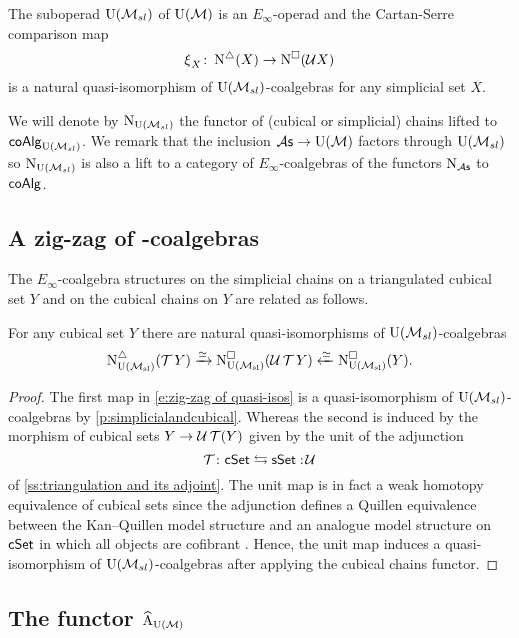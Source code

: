 \begin{proposition} \label{p:simplicialandcubical}
	The suboperad ${\operatorname{U}(\mathcal{M}_{sl})}$ of ${\operatorname{U}(\mathcal{M})}$ is an $E_\infty$-operad and the Cartan-Serre comparison map
	\[
	\operatorname{\xi}_X \colon \operatorname{N^{\triangle}}(X) \to \operatorname{N^{\square}}(\mathcal U X)
	\]
	is a natural quasi-isomorphism of ${\operatorname{U}(\mathcal{M}_{sl})}$-coalgebras for any simplicial set $X$.
\end{proposition}

We will denote by $\operatorname{N}_{\operatorname{U}(\mathcal{M}_{sl})}$ the functor of (cubical or simplicial) chains lifted to $\mathsf{coAlg}_{\operatorname{U}(\mathcal{M}_{sl})}$.
We remark that the inclusion ${\mathcal{A}\mathsf{s}} \to {\operatorname{U}(\mathcal{M})}$ factors through ${\operatorname{U}(\mathcal{M}_{sl})}$ so $\operatorname{N}_{\operatorname{U}(\mathcal{M}_{sl})}$ is also a lift to a category of $E_\infty$-coalgebras of the functors $\operatorname{N}_{\mathcal{A}\mathsf{s}}$ to $\mathsf{coAlg}$.

\subsection{A zig-zag of \pdfEinfty-coalgebras}
The $E_{\infty}$-coalgebra structures on the simplicial chains on a triangulated cubical set $Y$ and on the cubical chains on $Y$ are related as follows.

\begin{lemma} \label{l:zigzag}
	For any cubical set $Y$ there are natural quasi-isomorphisms of ${\operatorname{U}(\mathcal{M}_{sl})}$-coalgebras
	\begin{equation} \label{e:zig-zag of quasi-isos}
		\operatorname{N^{\triangle}_{{\operatorname{U}(\mathcal{M}_{sl})}}}(\operatorname{\mathcal{T}} Y) \xrightarrow{\simeq}
		\operatorname{N^{\square}_{{\operatorname{U}(\mathcal{M}_{sl})}}}(\mathcal{U}\operatorname{\mathcal{T}} Y) \xleftarrow{\simeq}
		\operatorname{N^{\square}_{{\operatorname{U}(\mathcal{M}_{sl})}}}(Y).
	\end{equation}
\end{lemma}

\begin{proof}
	The first map in \eqref{e:zig-zag of quasi-isos} is a quasi-isomorphism of ${\operatorname{U}(\mathcal{M}_{sl})}$-coalgebras by \cref{p:simplicialandcubical}.
	Whereas the second is induced by the morphism of cubical sets $Y \to \mathcal{U} \operatorname{\mathcal{T}} (Y)$ given by the unit of the adjunction
	\[
	\operatorname{\mathcal{T}} \colon \mathsf{cSet} \leftrightarrows \mathsf{sSet} :\! \mathcal{U}
	\]
	of \cref{ss:triangulation and its adjoint}.
	The unit map is in fact a weak homotopy equivalence of cubical sets since the adjunction defines a Quillen equivalence between the Kan--Quillen model structure and an analogue model structure on $\mathsf{cSet}$ in which all objects are cofibrant \cite{cisinski2006presheaves}.
	Hence, the unit map induces a quasi-isomorphism of ${\operatorname{U}(\mathcal{M}_{sl})}$-coalgebras after applying the cubical chains functor.
\end{proof}

\subsection{The functor $\operatorname{\widehat{A}}_{{\operatorname{U}(\mathcal{M})}}$} \label{s:ahatum}

